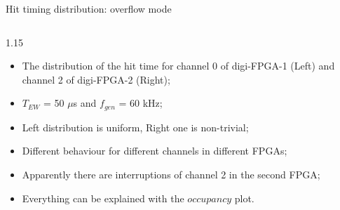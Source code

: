 \documentclass{beamer}
\begin{document}
\begin{frame}{Hit timing distribution: overflow mode}
\begin{columns}
\begin{column}{1.15\framewidth}
     \begin{itemize}
    
     \item The distribution of the hit time for channel 0 of digi-FPGA-1 (Left) and channel 2 of digi-FPGA-2 (Right);
     \item $T_{EW}$ = 50 $\mu$s and $f_{gen}$ = 60 kHz;
     \item Left distribution is uniform, Right one is non-trivial;
     \item Different behaviour for different channels in different FPGAs;
        \item Apparently there are interruptions of channel 2 in the second FPGA;
        \item Everything can be explained with the $occupancy$ plot.
    \end{itemize}
         \end{column}
\end{columns}   
\end{frame}
\end{document}
